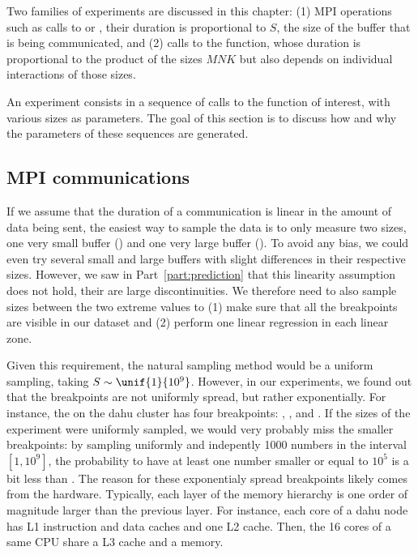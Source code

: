         Two families of experiments are discussed in this chapter: (1) MPI operations such as calls to
        \recv or \send, their duration is proportional to \(S\), the size of the buffer that is
        being communicated, and (2) calls to the \dgemm function, whose duration is proportional to the product
        of the sizes \(MNK\) but also depends on individual interactions of those sizes.

        An experiment consists in a sequence of calls to the function of interest, with various sizes as parameters. The
        goal of this section is to discuss how and why the parameters of these sequences are generated.

        \subsection{MPI communications}%

            If we assume that the duration of a communication is linear in the amount of data being sent, the easiest
            way to sample the data is to only measure two sizes, one very small buffer (\eg {}) and one very
            large buffer (\eg {}). To avoid any bias, we could even try several small and large
            buffers with slight differences in their respective sizes. However, we saw in Part~\ref{part:prediction}
            that this linearity assumption does not hold, their are large discontinuities. We therefore need to also
            sample sizes between the two extreme values to (1) make sure that all the breakpoints are visible in our
            dataset and (2) perform one linear regression in each linear zone.

            Given this requirement, the natural sampling method would be a uniform sampling, taking
            \(S\sim\unif{1}{10^9}\). However, in our experiments, we found out that the breakpoints are not uniformly
            spread, but rather exponentially. For instance, the \send on the dahu cluster has four
            breakpoints: , ,  and
            . If the sizes of the experiment were uniformly sampled, we would very probably miss
            the smaller breakpoints: by sampling uniformly and indepently 1000 numbers in the interval \([1, 10^9]\),
            the probability to have at least one number smaller or equal to \(10^5\) is a bit less than
            . The reason for these exponentialy spread breakpoints likely comes from the hardware.
            Typically, each layer of the memory hierarchy is one order of magnitude larger than the previous layer. For
            instance, each core of a dahu node has  L1 instruction and data caches and one
             L2 cache. Then, the 16 cores of a same CPU share a  L3 cache and
            a  memory.

